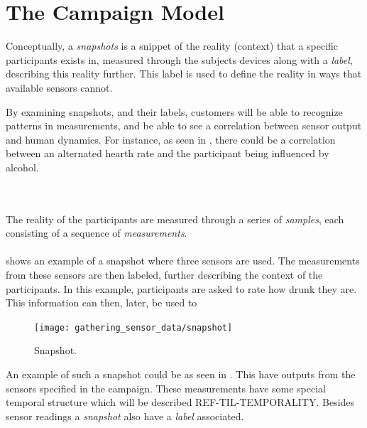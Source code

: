 
\section{The Campaign Model}

Conceptually, a \emph{snapshots} is a snippet of the reality (context) that a specific participants exists in, measured through the subjects devices along with a \emph{label}, describing this reality further. This label is used to define the reality in ways that available sensors cannot. 


By examining snapshots, and their labels, customers will be able to recognize patterns in measurements, and be able to see a correlation between sensor output and human dynamics. For instance, as seen in , there could be a correlation between an alternated hearth rate and the participant being influenced by alcohol. 

\\\\
The reality of the participants are measured through a series of \emph{samples}, each consisting of a sequence of \emph{measurements}.
\\\\
 shows an example of a snapshot where three sensors are used. The measurements from these sensors are then labeled, further describing the context of the participants. In this example, participants are asked to rate how drunk they are. This information can then, later, be used to 

\begin{figure}[!htbp]
    \centering
    \texttt{[image: gathering\_sensor\_data/snapshot]}
    \caption{Snapshot.}
    \label{fig:snapshot_example}
\end{figure}
\FloatBarrier

An example of such a snapshot could be as seen in . This have outputs from the sensors specified in the campaign. These measurements have some special temporal structure which will be described REF-TIL-TEMPORALITY. Besides sensor readings a \emph{snapshot} also have a \emph{label} associated. 

